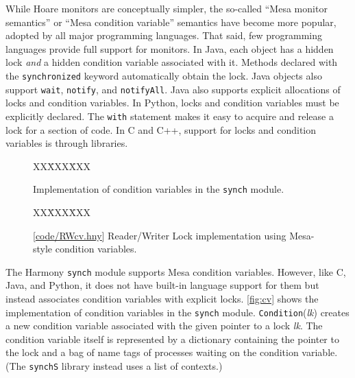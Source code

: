 \documentclass{report}
\newcommand{\harmonysource}[1]{
\begin{tabbing}
XX\=XXX\=XXX\kill
    
\end{tabbing}
}
\newcommand{\harmonylink}[1]{%
[\href{https://www.cs.cornell.edu/home/rvr/harmony/#1}{\underline{#1}}]%
}
\newenvironment{code}{
\tcolorbox
}{
\endtcolorbox
}
\begin{document}
While Hoare monitors are conceptually simpler, the so-called
``Mesa monitor semantics'' or ``Mesa condition variable'' semantics
have become more popular, adopted by all major
programming languages.
That said, few programming languages provide full support for monitors.
In Java, each object has a hidden lock \emph{and} a hidden condition variable
associated with it.
Methods declared with the \texttt{synchronized} keyword automatically
obtain the lock.  Java objects also support \texttt{wait}, \texttt{notify},
and \texttt{notifyAll}.  Java also supports explicit allocations of locks
and condition variables.
In Python, locks and condition variables must be explicitly declared.
The \texttt{with} statement makes it easy to acquire and release a lock
for a section of code.
In C and C++, support for locks and condition variables is through libraries.


\begin{figure}
\begin{code}
\harmonysource{mesa}
\end{code}
\caption{Implementation of condition variables in the \texttt{synch} module.}
\label{fig:cv}
\end{figure}

\begin{figure}
\begin{code}
\harmonysource{RWcv}
\end{code}
\caption{\harmonylink{code/RWcv.hny} Reader/Writer Lock implementation using Mesa-style condition variables.}
\label{fig:RWcv}
\end{figure}

The Harmony \texttt{synch} module supports Mesa condition variables.
However, like C, Java, and Python,
it does not have built-in language support for them but instead associates condition variables
with explicit locks.
\autoref{fig:cv} shows the implementation of
condition variables in the \texttt{synch} module.
\texttt{Condition}(\textit{lk}) creates a new condition variable associated with the given pointer
to a lock \textit{lk}.
The condition variable itself is represented by a dictionary containing the pointer to the lock
and a bag of name tags of processes waiting on the condition variable.
(The \texttt{synchS} library instead uses a list of contexts.)
\end{document}
